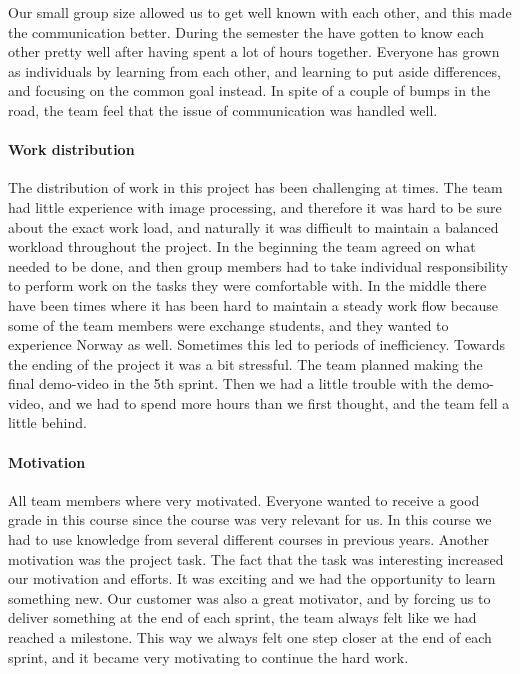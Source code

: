 Our small group size allowed us to get well known with each other, and this made the communication better.
During the semester the have gotten to know each other pretty well after having spent a lot of hours together. Everyone has grown as individuals by learning from each other, and learning to put aside differences, and focusing on the common goal instead.
In spite of a couple of bumps in the road, the team feel that the issue of communication was handled well.

\paragraph{Work distribution}
The distribution of work in this project has been challenging at times. 
The team had little experience with image processing, and therefore it was hard to be sure about the exact work load, and naturally it was difficult to maintain a balanced workload throughout the project. 
In the beginning the team agreed on what needed to be done, and then group members had to take individual responsibility to perform work on the tasks they were comfortable with. 
In the middle there have been times where it has been hard to maintain a steady work flow because some of the team members were exchange students, and they wanted to experience Norway as well. 
Sometimes this led to periods of inefficiency. Towards the ending of the project it was a bit stressful. The team planned making the final demo-video in the 5th sprint. Then we had a little trouble with the demo-video, and we had to spend more hours than we first thought, and the team fell a little behind.

\paragraph{Motivation}
All team members where very motivated. Everyone wanted to receive a good grade in this course since the course was very relevant for us. In this course we had to use knowledge from several different courses in previous years. Another motivation was the project task. The fact that the task was interesting increased our motivation and efforts. It was exciting and we had the opportunity to learn something new. Our customer was also a great motivator, and by forcing us to deliver something at the end of each sprint, the team always felt like we had reached a milestone. This way we always felt one step closer at the end of each sprint, and it became very motivating to continue the hard work. 

